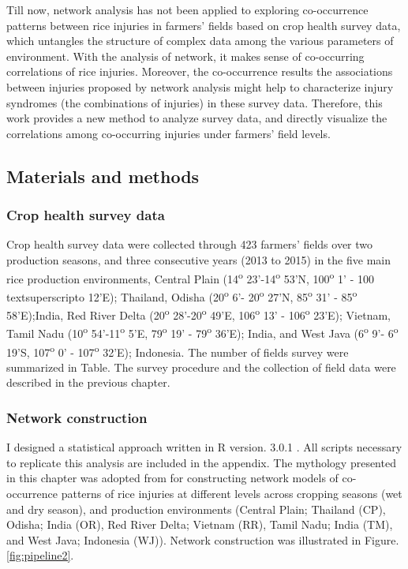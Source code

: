 Till now, network analysis has not been applied to exploring co-occurrence patterns between rice injuries in farmers’ fields based on crop health survey data, which untangles the structure of complex data among the various parameters of environment. With the analysis of network, it makes sense of co-occurring correlations of rice injuries. Moreover, the co-occurrence results the associations between injuries proposed by network analysis might help to characterize  injury syndromes (the combinations of injuries) in these survey data. Therefore, this work provides a new method to analyze survey data, and directly visualize the correlations among co-occurring injuries under farmers’ field levels.

\newpage
\subsection{Materials and methods} 

\subsubsection{Crop health survey data}
Crop health survey data were collected through 423 farmers’ fields over two production seasons, and three consecutive years (2013 to 2015) in the five main rice production environments, Central Plain (14\textsuperscript{o} 23’-14\textsuperscript{o} 53’N, 100\textsuperscript{o} 1’ - 100 textsuperscript{o} 12’E); Thailand, Odisha (20\textsuperscript{o} 6’- 20\textsuperscript{o} 27’N, 85\textsuperscript{o} 31’ - 85\textsuperscript{o} 58’E);India, Red River Delta (20\textsuperscript{o} 28’-20\textsuperscript{o} 49’E, 106\textsuperscript{o} 13’ - 106\textsuperscript{o}  23’E); Vietnam, Tamil Nadu (10\textsuperscript{o} 54’-11\textsuperscript{o} 5’E, 79\textsuperscript{o} 19’ - 79\textsuperscript{o}  36’E); India, and West Java (6\textsuperscript{o} 9’- 6\textsuperscript{o} 19’S, 107\textsuperscript{o} 0’ - 107\textsuperscript{o}  32’E); Indonesia. The number of fields survey were summarized in Table. The survey procedure and the collection of field data were described in  the previous chapter.


\subsubsection{Network construction}
I designed a statistical approach written in R version. 3.0.1 \citep{R_2015}. All scripts necessary to replicate this analysis are included in the appendix. The mythology presented in this chapter was adopted from \citet{Williams_2014_demonstrating} for constructing network models of co-occurrence patterns of rice injuries at different levels across cropping seasons (wet and dry season), and production environments (Central Plain; Thailand (CP), Odisha; India (OR), Red River Delta; Vietnam (RR), Tamil Nadu; India (TM), and West Java; Indonesia (WJ)). Network construction was illustrated in Figure.\ref{fig:pipeline2}.

